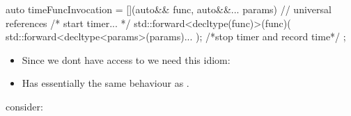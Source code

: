 \begin{cppcode}
auto timeFuncInvocation = 
  [](auto&& func, auto&&... params) { // universal references
    /* start timer... */
    std::forward<decltype(func)>(func)(
      std::forward<decltype<params>(params)...
    );
    /*stop timer and record time*/
  };
\end{cppcode}
\begin{itemize}
  \item Since we dont have access to  we need this  idiom:
  \item Has essentially the same behaviour as .
\end{itemize}
consider:
\begin{cppcode}
  
\end{cppcode}

